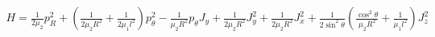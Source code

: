 \documentclass[
  20pt,
  a0paper,
  portrait,
  margin=0mm,
  innermargin=15mm,
  blockverticalspace=0mm,
  colspace=0mm,
  subcolspace=0mm
]{tikzposter}
\newcommand{\lb}{\left(}
\newcommand{\rb}{\right)}
\begin{document}
\begin{columns}
{{\begin{minipage}{0.5\linewidth}
\begin{tikzfigure}
\vspace*{-1cm}
\includegraphics[width=0.8\linewidth]{../pictures/coordsys/pp/coordsys-crop.pdf}
\label{fig:coordsys}
\end{tikzfigure} 
\end{minipage}
\begin{minipage}{0.5\linewidth}
\begin{tikzfigure}
\includegraphics[width=0.75\linewidth]{../pictures/potential/potential_dpi.pdf}
\label{fig:potential}
\end{tikzfigure}
\end{minipage}
\vspace*{-1cm}
\begin{gather}
H = \frac{1}{2 \mu_2} p_R^2 + \lb \frac{1}{2 \mu_2 R^2} + \frac{1}{2 \mu_1 l^2} \rb p_\theta^2 - \frac{1}{\mu_2 R^2} p_\theta J_y + \frac{1}{2 \mu_2 R^2} J_y^2 + \frac{1}{2 \mu_2 R^2} J_x^2 + \frac{1}{2 \sin^2 \theta} \lb \frac{\cos^2 \theta}{\mu_2 R^2} + \frac{1}{\mu_1 l^2} \rb J_z^2 

\end{gather}}}
\end{columns}
\end{document}
